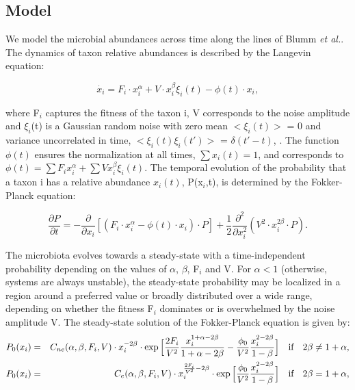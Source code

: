 \subsection*{Model} \label{sec:model}

We model the microbial abundances across time along the lines of Blumm \textit{et al.}\cite{ranking}. The dynamics of taxon relative abundances is described by the Langevin equation:
\begin{linenomath}
\begin{equation*}
\dot{x_i} = F_i \cdot x_i^\alpha + V \cdot x_i^\beta \xi_i(t) - \phi(t) \cdot x_i,
\end{equation*}
\end{linenomath}
where F$_i$ captures the fitness of the taxon i, V corresponds to the noise amplitude and $\xi_i$(t) is a Gaussian random noise with zero mean  $<\xi_i(t)>$ = 0 and variance uncorrelated in time, $<\xi_i(t) \xi_i(t')>$ =  $\delta(t'-t)$, . The function $\phi(t)$ ensures the normalization at all times, $\sum x_i(t) = 1$, and corresponds to $\phi(t) = \sum F_i x_i^\alpha + \sum V x_i^\beta \xi_i(t)$.
The temporal evolution of the probability that a taxon i has a relative abundance $x_i(t)$, P(x$_i$,t), is determined by the Fokker-Planck equation:
\begin{linenomath}
\begin{equation*}
\frac{\partial P}{\partial t} = - \frac{\partial}{\partial x_i}  [(F_i \cdot x_i^\alpha - \phi(t) \cdot x_i ) \cdot P]+ \frac{1}{2} \frac{\partial^2}{\partial x_i^2} (V^2 \cdot x_i^{2\beta}\cdot P).
\end{equation*}
\end{linenomath}
The microbiota evolves towards a steady-state with a time-independent probability depending on the values of $\alpha$, $\beta$, F$_i$ and V. For $\alpha<1$ (otherwise, systems are always unstable), the steady-state probability may be localized in a region around a preferred value or broadly distributed over a wide range, depending on whether the fitness F$_i$  dominates or is overwhelmed by the noise amplitude V. The steady-state solution of the Fokker-Planck equation is given by:
\begin{eqnarray}
P_0 (x_i) &=& C_{ne}(\alpha,\beta,F_i,V)  \cdot x_i^{-2\beta}  \cdot \exp\Big[\frac{2F_i}{V^2}\frac{x_i^{1+\alpha-2\beta}}{1+\alpha-2\beta}-\frac{\phi_0}{V^2}\frac{x_i^{2-2\beta}}{1-\beta}\Big] \quad \textrm{if} \quad  2\beta \ne 1+\alpha, \notag \\
P_0 (x_i) &=& C_e(\alpha,\beta,F_i,V)  \cdot x_i^{\frac{2F_i}{V^2} -2\beta}  \cdot \exp\Big[\frac{\phi_0}{V^2}\frac{x_i^{2-2\beta}}{1-\beta}\Big] \quad \textrm{if} \quad  2\beta = 1+\alpha,
\notag
\end{eqnarray}
